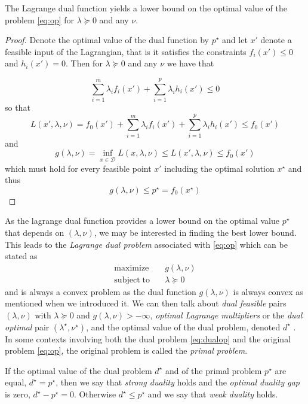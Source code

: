 \begin{theorem} \label{thm:lower}
  The Lagrange dual function yields a lower bound on the optimal value of the problem \eqref{eq:op} for $\lambda \succeq 0$ and any $\nu$.
\end{theorem}
\begin{proof}
  Denote the optimal value of the dual function by $p^\star$ and let $x'$ denote a feasible input of the Lagrangian, that is it satisfies the constraints $f_i(x') \le 0$ and $h_i(x') = 0$. Then for $\lambda \succeq 0$ and any $\nu$ we have that
  
  $$ \sum_{i=1}^m \lambda_i f_i(x') + \sum_{i=1}^p \lambda_i h_i(x') \le 0 $$
  so that
  $$ L(x',\lambda,\nu) = f_0(x') + \sum_{i=1}^m \lambda_i f_i(x') + \sum_{i=1}^p \lambda_i h_i(x') \le f_0(x') $$
  and
  $$ g(\lambda, \nu) = \inf_{x \in \mathcal{D}} L(x, \lambda, \nu) \le L(x', \lambda, \nu) \le f_0(x') $$
  which must hold for every feasible point $x'$ including the optimal solution $x^\star$ and thus
  $$ g(\lambda, \nu) \le p^\star = f_0(x^\star) $$ 
\end{proof}

As the lagrange dual function provides a lower bound on the optimal value $p^\star$ that depends on $(\lambda,\nu)$, we may be interested in finding the best lower bound. This leads to the \emph{Lagrange dual problem} associated with \eqref{eq:op} which can be stated as
\begin{align} \label{eq:dualop}
\mathrm{maximize}    \quad & g(\lambda, \nu) \nonumber \\
\mathrm{subject\;to} \quad & \lambda \succeq 0
\end{align}
and is always a convex problem as the dual function $g(\lambda, \nu)$ is always convex as mentioned when we introduced it. We can then talk about \emph{dual feasible} pairs $(\lambda,\nu)$ with $\lambda \succeq 0$ and $g(\lambda,\nu) > -\infty$, \emph{optimal Lagrange multipliers} or the \emph{dual optimal} pair $(\lambda^\star, \nu^\star)$, and the optimal value of the dual problem, denoted $d^\star$ . In some contexts involving both the dual problem \eqref{eq:dualop} and the original problem \eqref{eq:op}, the original problem is called the \emph{primal problem}.

If the optimal value of the dual problem $d^\star$ and of the primal problem $p^\star$ are equal, $d^\star = p^\star$, then we say that \emph{strong duality} holds and the \emph{optimal duality gap} is zero, $d^\star - p^\star = 0$. Otherwise $d^\star \le p^\star$ and we say that \emph{weak duality} holds.

